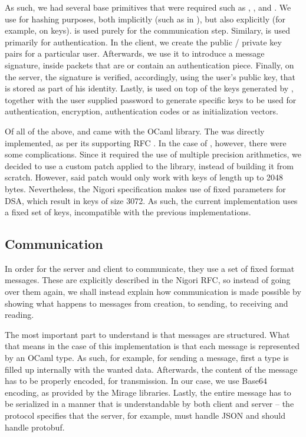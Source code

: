 As such, we had several base primitives that were required such as , ,  and .
We use  for hashing purposes, both implicitly (such as in ), but also explicitly (for example, on  keys).
 is used purely for the communication step.
Similary,  is used primarily for authentication.
In the client, we create the public / private key pairs for a particular user.
Afterwards, we use it to introduce a message signature, inside packets that are or contain an authentication piece.
Finally, on the server, the signature is verified, accordingly, using the user's public key, that is stored as part of his identity.
Lastly,  is used on top of the keys generated by , together with the user supplied password to generate specific keys to be used for authentication, encryption, authentication codes or as initialization vectors.

Of all of the above,  and  came with the OCaml  library.
The  was directly implemented, as per its supporting RFC \cite{RFC2898}.
In the case of , however, there were some complications.
Since it required the use of multiple precision arithmetics, we decided to use a custom patch applied to the  library, instead of building it from scratch.
However, said patch would only work with keys of length up to 2048 bytes.
Nevertheless, the Nigori specification makes use of fixed parameters for DSA, which result in keys of size 3072.
As such, the current implementation uses a fixed set of keys, incompatible with the previous implementations.

\subsection{Communication}
In order for the server and client to communicate, they use a set of fixed format messages.
These are explicitly described in the Nigori RFC, so instead of going over them again, we shall instead explain how communication is made possible by showing what happens to messages from creation, to sending, to receiving and reading.

The most important part to understand is that messages are structured.
What that means in the case of this implementation is that each message is represented by an OCaml type.
As such, for example, for sending a message, first a type is filled up internally with the wanted data.
Afterwards, the content of the message has to be properly encoded, for transmission.
In our case, we use Base64 encoding, as provided by the Mirage libraries.
Lastly, the entire message has to be serialized in a manner that is understandable by both client and server -- the protocol specifies that the server, for example, must handle JSON and should handle protobuf.


